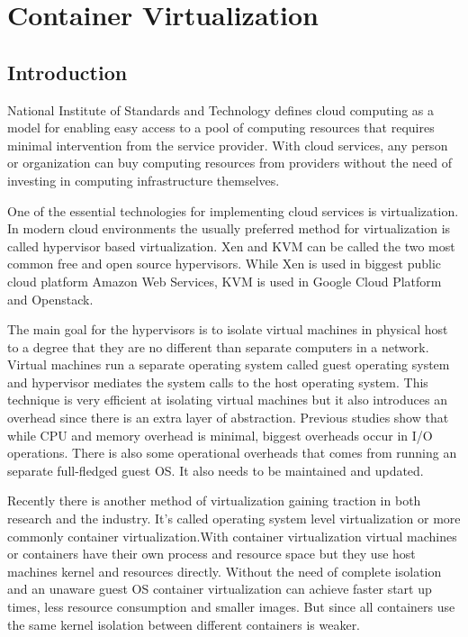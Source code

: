 \documentclass[12pt,oneandhalf,chaparabic,ceng,ms,eng,oneside,pntc]{gsufbe}
\begin{document}

\chapter{Container Virtualization}
\section{Introduction}
National Institute of Standards and Technology defines cloud computing as a model for enabling
easy access to a pool of computing resources that requires minimal intervention from the service
provider. With cloud services, any person or organization can buy computing resources from providers
without the need of investing in computing infrastructure themselves. 

One of the essential technologies for implementing cloud services is virtualization. In modern cloud
environments the usually preferred method for virtualization is called hypervisor based virtualization.
Xen and KVM can be called the two most common free and open source hypervisors. While Xen is used in
biggest public cloud platform Amazon Web Services, KVM is used in Google Cloud Platform and Openstack.

The main goal for the hypervisors is to isolate virtual machines in physical host to a degree that they
are no different than separate computers in a network. Virtual machines run a separate operating system
called guest operating system and hypervisor mediates the system calls to the host operating system.
This technique is very efficient at isolating virtual machines but it also introduces an overhead
since there is an extra layer of abstraction. Previous studies show that while CPU and memory overhead
is minimal, biggest overheads occur in I/O operations. There is also some operational overheads that
comes from running an separate full-fledged guest OS. It also needs to be maintained and updated.

Recently there is another method of virtualization gaining traction in both research and the industry.
It's called operating system level virtualization or more commonly container virtualization.With
container virtualization virtual machines or containers have their own process and resource space but
they use host machines kernel and resources directly. Without the need of complete isolation and an
unaware guest OS container virtualization can achieve faster start up times, less resource consumption
and smaller images. But since all containers use the same kernel isolation between different containers
is weaker.
\end{document}
